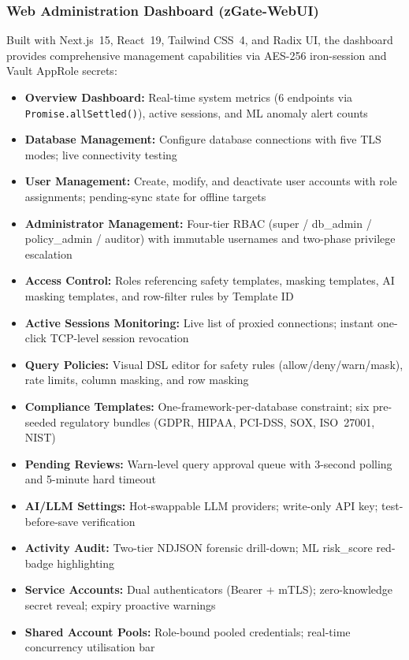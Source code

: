 \subsubsection{Web Administration Dashboard (zGate-WebUI)}
Built with Next.js~15, React~19, Tailwind CSS~4, and Radix UI, the dashboard provides comprehensive management capabilities via AES-256 iron-session and Vault AppRole secrets:
\begin{itemize}
    \item \textbf{Overview Dashboard:} Real-time system metrics (6 endpoints via \texttt{Promise.allSettled()}), active sessions, and ML anomaly alert counts
    \item \textbf{Database Management:} Configure database connections with five TLS modes; live connectivity testing
    \item \textbf{User Management:} Create, modify, and deactivate user accounts with role assignments; pending-sync state for offline targets
    \item \textbf{Administrator Management:} Four-tier RBAC (super / db\_admin / policy\_admin / auditor) with immutable usernames and two-phase privilege escalation
    \item \textbf{Access Control:} Roles referencing safety templates, masking templates, AI masking templates, and row-filter rules by Template ID
    \item \textbf{Active Sessions Monitoring:} Live list of proxied connections; instant one-click TCP-level session revocation
    \item \textbf{Query Policies:} Visual DSL editor for safety rules (allow/deny/warn/mask), rate limits, column masking, and row masking
    \item \textbf{Compliance Templates:} One-framework-per-database constraint; six pre-seeded regulatory bundles (GDPR, HIPAA, PCI-DSS, SOX, ISO~27001, NIST)
    \item \textbf{Pending Reviews:} Warn-level query approval queue with 3-second polling and 5-minute hard timeout
    \item \textbf{AI/LLM Settings:} Hot-swappable LLM providers; write-only API key; test-before-save verification
    \item \textbf{Activity Audit:} Two-tier NDJSON forensic drill-down; ML risk\_score red-badge highlighting
    \item \textbf{Service Accounts:} Dual authenticators (Bearer + mTLS); zero-knowledge secret reveal; expiry proactive warnings
    \item \textbf{Shared Account Pools:} Role-bound pooled credentials; real-time concurrency utilisation bar
\end{itemize}


